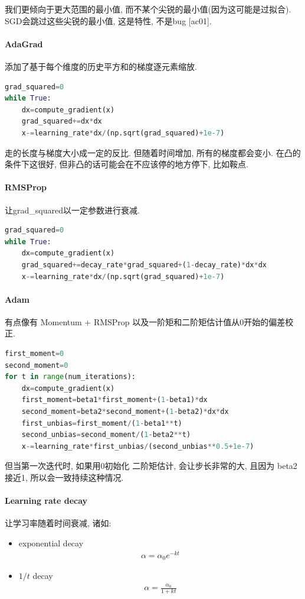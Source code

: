 我们更倾向于更大范围的最小值, 而不某个尖锐的最小值(因为这可能是过拟合). SGD会跳过这些尖锐的最小值, 这是特性, 不是bug [ac01]. 

\paragraph{AdaGrad}添加了基于每个维度的历史平方和的梯度逐元素缩放. 
\begin{lstlisting}[language={python}]
grad_squared=0
while True:
    dx=compute_gradient(x)
    grad_squared+=dx*dx
    x-=learning_rate*dx/(np.sqrt(grad_squared)+1e-7)
\end{lstlisting}

走的长度与梯度大小成一定的反比. 但随着时间增加, 所有的梯度都会变小. 在凸的条件下这很好, 但非凸的话可能会在不应该停的地方停下, 比如鞍点. 

\paragraph{RMSProp} 让grad\_squared以一定参数进行衰减. 
\begin{lstlisting}[language={python}]
grad_squared=0
while True:
    dx=compute_gradient(x)
    grad_squared+=decay_rate*grad_squared+(1-decay_rate)*dx*dx
    x-=learning_rate*dx/(np.sqrt(grad_squared)+1e-7)
\end{lstlisting}

\paragraph{Adam} 有点像有 Momentum + RMSProp 以及一阶矩和二阶矩估计值从0开始的偏差校正. 
\begin{lstlisting}[language={python}]
first_moment=0
second_moment=0
for t in range(num_iterations):
    dx=compute_gradient(x)
    first_moment=beta1*first_moment+(1-beta1)*dx
    second_moment=beta2*second_moment+(1-beta2)*dx*dx
    first_unbias=first_moment/(1-beta1**t)
    second_unbias=second_moment/(1-beta2**t)
    x-=learning_rate*first_unbias/(second_unbias**0.5+1e-7)
\end{lstlisting}
但当第一次迭代时, 如果用0初始化 二阶矩估计, 会让步长非常的大, 且因为 beta2 接近1, 所以会一致持续这种情况. 

\paragraph{Learning rate decay}
让学习率随着时间衰减, 诸如:
\begin{itemize}
    \item exponential decay
    \begin{align*}
        \alpha=\alpha_0 e^{-kt}
    \end{align*}
    \item $1/t$ decay
    \begin{align*}
        \alpha=\frac{\alpha_0}{1+kt}
    \end{align*}
\end{itemize}

